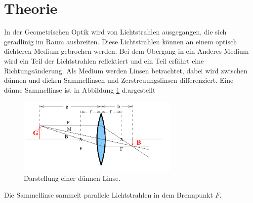 \section{Theorie}
\label{sec:Theorie}
In der Geometrischen Optik wird von Lichtstrahlen ausgegangen, die sich geradlinig im Raum ausbreiten.
Diese Lichtstrahlen können an einem optisch dichteren Medium gebrochen werden.
Bei dem Übergang in ein Anderes Medium wird ein Teil der Lichtstrahlen reflektiert und ein Teil erfährt eine
Richtungsänderung.
Als Medium werden Linsen betrachtet, dabei wird zwischen dünnen und dicken Sammellinsen und Zerstreuungslinsen
differenziert.
Eine dünne Sammellinse ist in Abbildung \ref{fig:dünn} d.argestellt
\begin{figure}
 \centering
 \includegraphics[width=0.7\textwidth]{dünn.PNG}
 \caption{Darstellung einer dünnen Linse.\cite{sample}}
 \label{fig:dünn}
 \end{figure}
 Die Sammellinse sammelt parallele Lichtstrahlen in dem Brennpunkt $F$.
